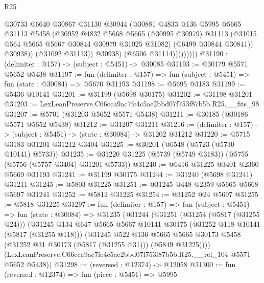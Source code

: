 \begin{lexlean}{R25}
\begin{coremodule}
                          @30733
                          @6640
                          @30867
                          @31130
                          @30944
                          (@30881
                            @4833
                            @136
                            @5995
                            @5665
                            @31113
                            @5458
                            (@30952
                              @4832
                              @5668
                              @5665
                              (@30995 @30979)
                              @31113
                              (@31015 @564 @5665 @5667 @30844 @30979 @31025 @31082)
                              (@6499 @30844 @30841))
                            @30938))
                        (@31092 @31113))
                      @30938)
                    (@6506 @31114)))))))))
@31190 := (delimiter : @157) -> (subject : @5451) -> @30085
@31193 := @30179 @5571 @5652 @5438
@31197 := fun (delimiter : @157) => fun (subject : @5451) => fun (state : @30084) => @5670 @31193
@31198 := @5695 @3183
@31199 := @5436 @10141
@31201 := @31199 (@5698 @30175)
@31202 := @31198 @31201
@31203 := LexLeanPreserve.C66cca9ac7fc4c5ae2bbd07f753f87b5b.R25.__fits_98
@31207 := @5701 (@31203 @5652 @5571 @5438)
@31211 := @30185 (@30186 @5571 @5652 @5438)
@31212 := @31207 @31211
@31216 := (delimiter : @157) -> (subject : @5451) -> (state : @30084) -> @31202 @31212
@31220 := @5715 @3183 @31201 @31212 @3404
@31225 := @30201 (@6548 (@5723 (@5730 @10141) @5733))
@31235 := @31220 @31225 (@5739 (@5749 @3183)) (@5755 (@5756 (@5757 @3404) @31201 @5733))
@31240 := @6416 @31225 @3401 @2360 @5669 @31193
@31241 := @31199 @30175
@31244 := @31240 (@5698 @31241) @31211
@31245 := @5803 @31225
@31251 := @31245 @448 @2359 @5665 @5668 @5697 @31241
@31252 := @5812 @31225
@31254 := @31252 @24 @5697
@31255 := @5818 @31225
@31297 := fun (delimiter : @157) =>
  fun (subject : @5451) =>
  fun (state : @30084) =>
  @31235
    (@31244
      (@31251
        (@31254 (@5817 (@31255 @24)))
        (@31245
          @134
          @647
          @5665
          @5667
          @10141
          @30175
          (@31252 @118 @10141 (@5817 (@31255 @118)))
          (@31245
            @522
            @136
            @5665
            @5665
            @30173
            @5458
            (@31252 @31 @30173 (@5817 (@31255 @31)))
            (@5849 @31225))))
      (LexLeanPreserve.C66cca9ac7fc4c5ae2bbd07f753f87b5b.R25.__rel_104 @5571 @5652 @5438))
@31298 := (reversed : @12374) -> @12058
@31300 := fun (reversed : @12374) => fun (piece : @5451) => @5995

\end{coremodule}
\end{lexlean}
